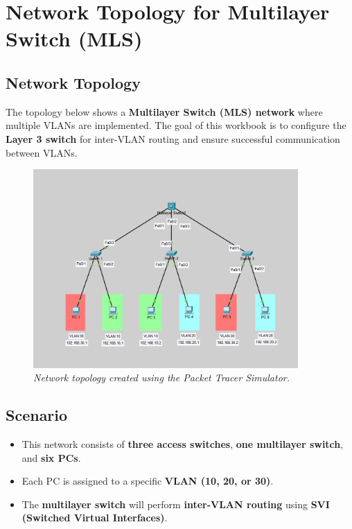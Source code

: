 \documentclass[a4paper]{book}
\begin{document}
\chapter{Network Topology for Multilayer Switch (MLS)}

\section{Network Topology}
The topology below shows a \textbf{Multilayer Switch (MLS) network} where multiple VLANs are implemented. The goal of this workbook is to configure the \textbf{Layer 3 switch} for inter-VLAN routing and ensure successful communication between VLANs.


\begin{figure}[h]
    \centering
    \includegraphics[width=0.9\textwidth]{MLS.jpg}
    \caption{\textit{Network topology created using the Packet Tracer Simulator.}}

    \label{fig:packet_tracer_topology}
\end{figure}


\section{Scenario}
\begin{itemize}
    \item This network consists of \textbf{three access switches}, \textbf{one multilayer switch}, and \textbf{six PCs}.
    \item Each PC is assigned to a specific \textbf{VLAN (10, 20, or 30)}.
    \item The \textbf{multilayer switch} will perform \textbf{inter-VLAN routing} using \textbf{SVI (Switched Virtual Interfaces)}.
\end{itemize}
\end{document}
